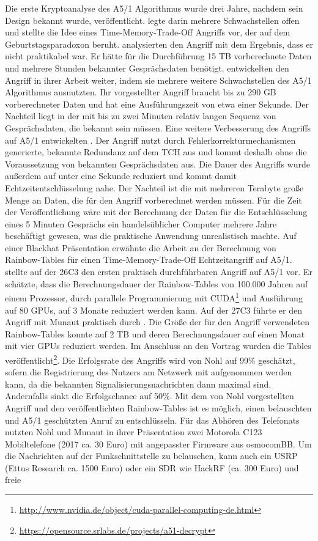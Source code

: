 Die erste Kryptoanalyse des A5/1 Algorithmus wurde drei Jahre, nachdem sein Design bekannt wurde, veröffentlicht. \citet{golic1997cryptanalysis} legte darin mehrere Schwachstellen offen und stellte die Idee eines Time-Memory-Trade-Off Angriffs vor, der auf dem Geburtstagsparadoxon beruht. \citet{Biryukov2001} analysierten den Angriff mit dem Ergebnis, dass er nicht praktikabel war. Er hätte für die Durchführung 15 TB vorberechnete Daten und mehrere Stunden bekannter Gesprächsdaten benötigt. \citet{Biryukov2001} entwickelten den Angriff in ihrer Arbeit weiter, indem sie mehrere weitere Schwachstellen des A5/1 Algorithmus ausnutzten. Ihr vorgestellter Angriff braucht bis zu 290 GB vorberechneter Daten und hat eine Ausführungszeit von etwa einer Sekunde. Der Nachteil liegt in der mit bis zu zwei Minuten relativ langen Sequenz von Gesprächsdaten, die bekannt sein müssen. Eine weitere Verbesserung des Angriffs auf A5/1 entwickelten \citet{barkan2003instant}. Der Angriff nutzt durch Fehlerkorrekturmechanismen generierte, bekannte Redundanz auf dem \ac{TCH} aus und kommt deshalb ohne die Voraussetzung von bekannten Gesprächsdaten aus. Die Dauer des Angriffs wurde außerdem auf unter eine Sekunde reduziert und kommt damit Echtzeitentschlüsselung nahe. Der Nachteil ist die mit mehreren Terabyte große Menge an Daten, die für den Angriff vorberechnet werden müssen. Für die Zeit der Veröffentlichung wäre mit der Berechnung der Daten für die Entschlüsselung eines 5 Minuten Gesprächs ein handelsüblicher Computer mehrere Jahre beschäftigt gewesen, was die praktische Anwendung unrealistisch machte. Auf einer Blackhat Präsentation erwähnte  \citet{hulton2008intercepting} die Arbeit an der Berechnung von Rainbow-Tables für einen Time-Memory-Trade-Off Echtzeitangriff auf A5/1. \citet{nohl2009gsm} stellte auf der 26C3 den ersten praktisch durchführbaren Angriff auf A5/1 vor. Er schätzte, dass die Berechnungsdauer der Rainbow-Tables von 100.000 Jahren auf einem Prozessor, durch parallele Programmierung mit CUDA\footnote{\url{http://www.nvidia.de/object/cuda-parallel-computing-de.html}} und Ausführung auf 80 \acp{GPU}, auf 3 Monate reduziert werden kann. Auf der 27C3 führte er den Angriff mit Munaut praktisch durch \citep{nohl2010wideband}. Die Größe der für den Angriff verwendeten Rainbow-Tables konnte auf 2 TB und deren Berechnungsdauer auf einen Monat mit vier \acp{GPU} reduziert werden. Im Anschluss an den Vortrag wurden die Tables veröffentlicht\footnote{\url{https://opensource.srlabs.de/projects/a51-decrypt}}. Die Erfolgsrate des Angriffs wird von Nohl auf 99\% geschätzt, sofern die Registrierung des Nutzers am Netzwerk mit aufgenommen werden kann, da die bekannten Signalisierungsnachrichten dann maximal sind. Andernfalls sinkt die Erfolgschance auf 50\%. Mit dem von Nohl vorgestellten Angriff und den veröffentlichten Rainbow-Tables ist es möglich, einen belauschten und A5/1 geschützten Anruf zu entschlüsseln. Für das Abhören des Telefonats nutzten Nohl und Munaut in ihrer Präsentation zwei Motorola C123 Mobiltelefone (2017 ca. 30 Euro) mit angepasster Firmware aus osmocomBB. Um die Nachrichten auf der Funkschnittstelle zu belauschen, kann auch ein \ac{USRP} (Ettus Research ca. 1500 Euro) oder ein \ac{SDR} wie HackRF (ca. 300 Euro) und freie 